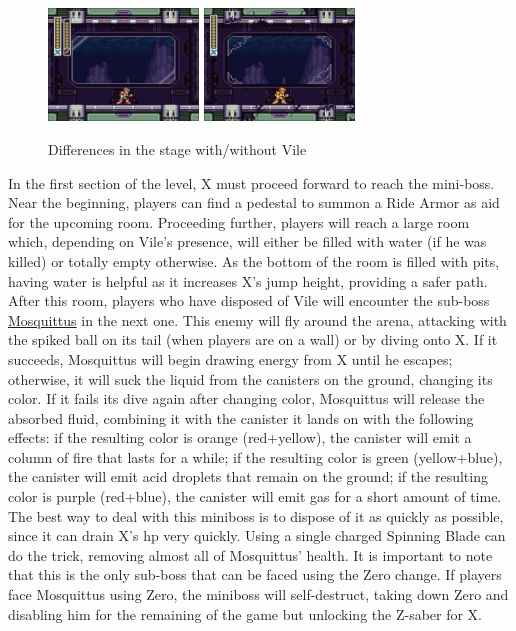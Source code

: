 \begin{figure}[htp]
	\centering
	\includegraphics[height=3cm]{figures/X3/Doppler_stages/dopp_B_1.jpg}
	\includegraphics[height=3cm]{figures/X3/Doppler_stages/dopp_B_2.jpg}
	\caption{Differences in the stage with/without Vile}
\end{figure}

In the first section of the level, X must proceed forward to reach the mini-boss. Near the beginning, players can find a pedestal to summon a Ride Armor as aid for the upcoming room. Proceeding further, players will reach a large room which, depending on Vile's presence, will either be filled with water (if he was killed) or totally empty otherwise. As the bottom of the room is filled with pits, having water is helpful as it increases X's jump height, providing a safer path. After this room, players who have disposed of Vile will encounter the sub-boss \hyperlink{miniboss:Mosquittus}{Mosquittus} in the next one. This enemy will fly around the arena, attacking with the spiked ball on its tail (when players are on a wall) or by diving onto X. If it succeeds, Mosquittus will begin drawing energy from X until he escapes; otherwise, it will suck the liquid from the canisters on the ground, changing its color. If it fails its dive again after changing color, Mosquittus will release the absorbed fluid, combining it with the canister it lands on with the following effects: if the resulting color is orange (red+yellow), the canister will emit a column of fire that lasts for a while; if the resulting color is green (yellow+blue), the canister will emit acid droplets that remain on the ground; if the resulting color is purple (red+blue), the canister will emit gas for a short amount of time. The best way to deal with this miniboss is to dispose of it as quickly as possible, since it can drain X's hp very quickly. Using a single charged Spinning Blade can do the trick, removing almost all of Mosquittus' health. It is important to note that this is the only sub-boss that can be faced using the Zero change. If players face Mosquittus using Zero, the miniboss will self-destruct, taking down Zero and disabling him for the remaining of the game but unlocking the Z-saber for X.


